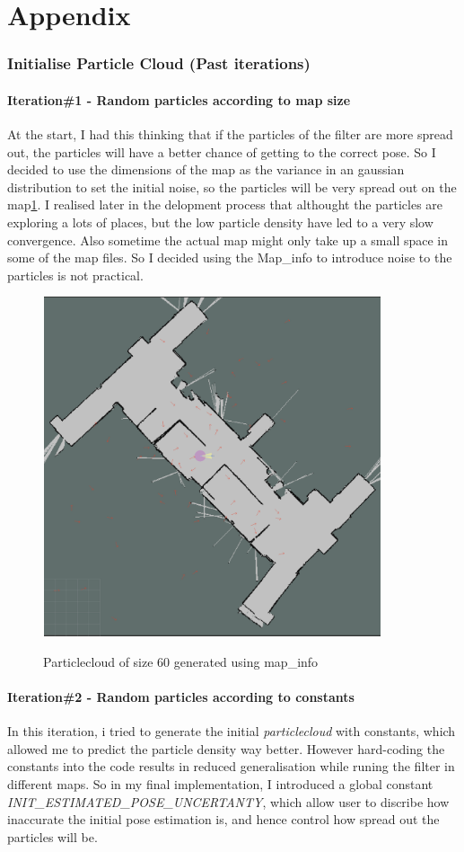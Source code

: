 \documentclass[11pt,a4paper]{article}
\begin{document}
\part{Appendix}
\section{Initialise Particle Cloud (Past iterations)}
  \subsection{Iteration\#1 - Random particles according to map size}
  At the start, I had this thinking that if the particles of the filter are more spread out, the particles will
  have a better chance of getting to the correct pose. So I decided to use the dimensions of the map as the variance in an gaussian distribution
  to set the initial noise, so the particles will be very spread out on the map\ref{fig:gbm}. I realised later in the
  delopment process that althought the particles are exploring a lots of places, but the low particle density have led
  to a very slow convergence. Also sometime the actual map might only take up a small space in some of the map files. So 
  I decided using the Map\_info to introduce noise to the particles is not practical.
  \begin{figure}[h]
      \caption{Particlecloud of size 60 generated using map\_info}
      \centering
      \includegraphics[width=10cm, height=10cm]{gen_by_map_info.png}
      \label{fig:gbm}
    \end{figure}
  \subsection{Iteration\#2 - Random particles according to constants}
    In this iteration, i tried to generate the initial \textit{particlecloud} with constants, which allowed me to
    predict the particle density way better. However hard-coding the constants into the code results in reduced generalisation 
    while runing the filter in different maps. So in my final implementation, I introduced a global constant \textit{INIT\_ESTIMATED\_POSE\_UNCERTANTY},
    which allow user to discribe how inaccurate the initial pose estimation is, and hence control how spread out the particles will be.
\end{document}
